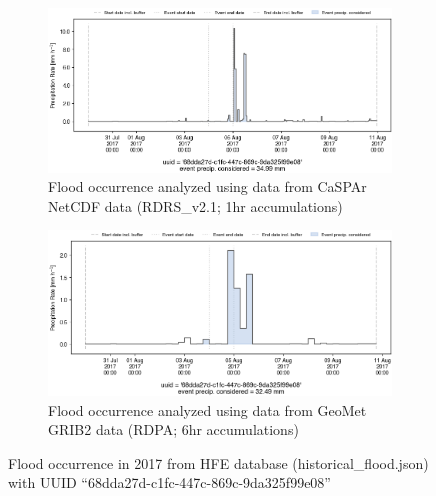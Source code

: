 \documentclass[10pt,a4paper,titlepage,parskip]{scrartcl}
\begin{document}
\begin{figure}[h]
	\begin{subfigure}[a]{1.0\textwidth}
		\centering
		\includegraphics[width=\linewidth]{figures/compare_Geomet_CaSPAr/interpolated_at_stations_occurrence_1057_identified-timesteps_RDRS_v2.1.png}
		\caption{Flood occurrence analyzed using data from CaSPAr NetCDF data (RDRS\_v2.1; 1hr accumulations)}
	\end{subfigure}
	\par\bigskip\bigskip
	\begin{subfigure}[b]{1.0\textwidth}
		\centering
		\includegraphics[width=\linewidth]{figures/compare_Geomet_CaSPAr/interpolated_at_stations_occurrence_1057_identified-timesteps_rdpa:10km:6f.png}
		\caption{Flood occurrence analyzed using data from GeoMet GRIB2 data (RDPA; 6hr accumulations)}
	\end{subfigure}
	\par\bigskip\bigskip
	\caption{Flood occurrence in 2017 from HFE database (historical\_flood.json) with UUID ``68dda27d-c1fc-447c-869c-9da325f99e08''}
\end{figure}
\pagebreak
\end{document}
